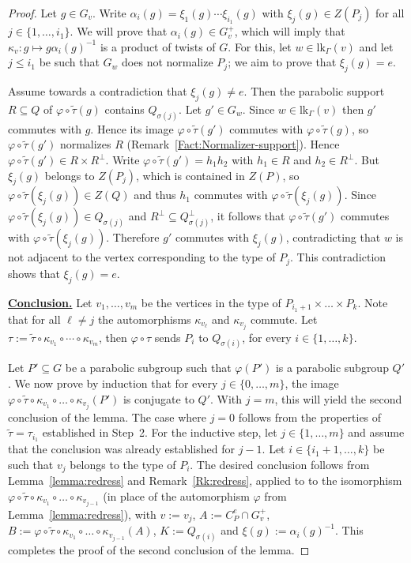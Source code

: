 \documentclass[a4paper,english,11pt]{article}
\theoremstyle{definition}
\theoremstyle{remark}
\newcommand{\lk}{\mathrm{lk}}
\newcommand{\twistor}{\xi}
\begin{document}
\begin{proof}
\smallskip

Let $g\in G_v$. Write $\alpha_i(g)=\twistor_1(g)\cdots\twistor_{i_1}(g)$ with $\twistor_j(g)\in Z(P_j)$ for all $j\in \{1,\dots,i_1\}$. We will prove that $\alpha_i(g)\in G_v^+$, which will imply that $\kappa_v:g\mapsto g\alpha_i(g)^{-1}$ is a product of twists of $G$. For this, let $w\in \lk_\Gamma(v)$ and let $j\leq i_1$ be such that $G_w$ does not normalize $P_j$; we aim to prove that $\twistor_{j}(g)=e$.

Assume towards a contradiction that $\twistor_j(g)\neq e$. Then the parabolic support $R\subseteq Q$ of $\varphi\circ \tilde\tau(g)$ contains $Q_{\sigma(j)}$. Let $g'\in G_w$. Since $w\in \lk_{\Gamma}(v)$ then $g'$ commutes with $g$. Hence its image $\varphi\circ \tilde\tau(g')$ commutes with $\varphi\circ \tilde\tau(g)$, so $\varphi\circ \tilde\tau(g')$ normalizes $R$ (Remark~\ref{Fact:Normalizer-support}). Hence $\varphi\circ \tilde\tau(g')\in R\times R^{\perp}$. Write $\varphi\circ \tilde\tau(g')=h_1h_2$ with $h_1\in R$ and $h_2\in R^\perp$. But $\twistor_j(g)$ belongs to $Z(P_j)$, which is contained in $Z(P)$, so $\varphi\circ \tilde{\tau}(\twistor_j(g))\in Z(Q)$ and thus $h_1$ commutes with $\varphi\circ \tilde\tau(\twistor_j(g))$. Since $\varphi\circ \tilde{\tau}(\twistor_j(g))\in Q_{\sigma(j)}$ and $R^\perp\subseteq Q_{\sigma(j)}^\perp$, it follows that $\varphi\circ\tilde\tau(g')$ commutes with $\varphi\circ\tilde\tau(\twistor_j(g))$. Therefore $g'$ commutes with $\twistor_j(g)$, contradicting that $w$ is not adjacent to the vertex corresponding to the type of $P_j$. This contradiction shows that $\twistor_j(g)=e$.
\medskip

\underline{\textbf{Conclusion.}} Let $v_1,\dots,v_m$ be the vertices in the type of $P_{i_1+1}\times\dots\times P_k$. Note that for all $\ell \neq j$ the automorphisms $\kappa_{v_\ell}$ and $\kappa_{v_j}$ commute. Let $\tau:=\tilde\tau\circ\kappa_{v_1}\circ \cdots \circ \kappa_{v_m}$, then $\varphi\circ\tau$ sends $P_i$ to $Q_{\sigma(i)}$, for every $i\in\{1,\dots,k\}$. 

Let $P'\subseteq G$ be a parabolic subgroup such that $\varphi(P')$ is a
parabolic subgroup $Q'$. We now prove by induction that for every
$j\in\{0,\dots,m\}$, the image $\varphi\circ \tilde{\tau}\circ \kappa_{v_1}\circ
\dots \circ \kappa_{v_j}(P')$ is conjugate to $Q'$. With $j=m$, this will yield
the second conclusion of the lemma. The case where $j=0$ follows from the
properties of $\tilde\tau=\tau_{i_1}$ established in Step~2. For the inductive
step, let $j\in\{1,\dots,m\}$ and assume that the conclusion was already
established for $j-1$. Let $i\in\{i_1+1,\dots,k\}$ be such that $v_j$ belongs to
the type of $P_i$. The desired conclusion follows from Lemma~\ref{lemma:redress}
and Remark~\ref{Rk:redress}, applied to to the isomorphism $\varphi\circ
\tilde{\tau}\circ \kappa_{v_1}\circ \dots \circ \kappa_{v_{j-1}}$ (in place of
the automorphism $\varphi$ from Lemma~\ref{lemma:redress}), with $v:=v_j$,
$A:=C_P^e\cap G_v^+$, $B:=\varphi\circ \tilde{\tau}\circ \kappa_{v_1}\circ \dots
\circ \kappa_{v_{j-1}}(A)$, $K:=Q_{\sigma(i)}$ and $\xi(g):=\alpha_i(g)^{-1}$.
This completes the proof of the second conclusion of the lemma.


\end{proof}
\end{document}
